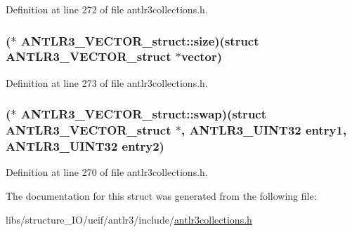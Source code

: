 Definition at line 272 of file antlr3collections.\-h.

\hypertarget{struct_a_n_t_l_r3___v_e_c_t_o_r__struct_abbce5d284607c8cf9960ba43d3fe6a78}{
\subsubsection[{size}]{($\ast$ A\-N\-T\-L\-R3\-\_\-\-V\-E\-C\-T\-O\-R\-\_\-struct\-::size)(struct {\bf A\-N\-T\-L\-R3\-\_\-\-V\-E\-C\-T\-O\-R\-\_\-struct} $\ast${\bf vector})}}\label{struct_a_n_t_l_r3___v_e_c_t_o_r__struct_abbce5d284607c8cf9960ba43d3fe6a78}


Definition at line 273 of file antlr3collections.\-h.

\hypertarget{struct_a_n_t_l_r3___v_e_c_t_o_r__struct_acb96372afff7ba864d2ea91283d73061}{
\subsubsection[{swap}]{($\ast$ A\-N\-T\-L\-R3\-\_\-\-V\-E\-C\-T\-O\-R\-\_\-struct\-::swap)(struct {\bf A\-N\-T\-L\-R3\-\_\-\-V\-E\-C\-T\-O\-R\-\_\-struct} $\ast$, {\bf A\-N\-T\-L\-R3\-\_\-\-U\-I\-N\-T32} entry1, {\bf A\-N\-T\-L\-R3\-\_\-\-U\-I\-N\-T32} entry2)}}\label{struct_a_n_t_l_r3___v_e_c_t_o_r__struct_acb96372afff7ba864d2ea91283d73061}


Definition at line 270 of file antlr3collections.\-h.



The documentation for this struct was generated from the following file\-:\begin{DoxyCompactItemize}
\item 
libs/structure\-\_\-\-I\-O/ucif/antlr3/include/\hyperlink{antlr3collections_8h}{antlr3collections.\-h}\end{DoxyCompactItemize}
